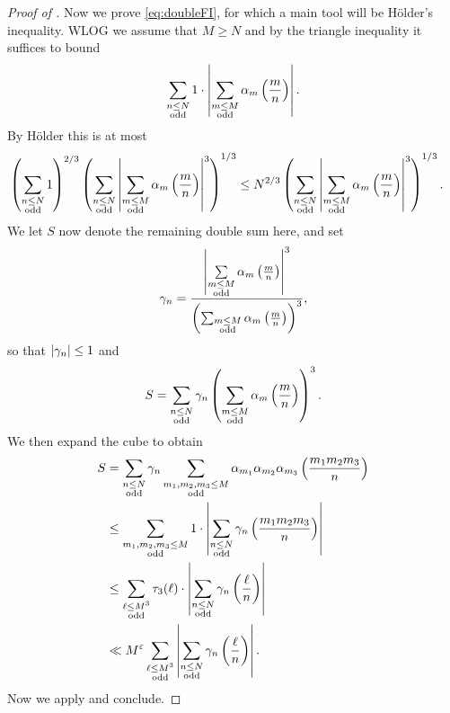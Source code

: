 \documentclass{lecturenotes}
\numberwithin{equation}{section}
\begin{document}
\begin{proof}[Proof of ]
    Now we prove \eqref{eq:doubleFI}, for which a main tool will be H\"older's inequality.  WLOG we assume that $M\geq N$ and by the triangle inequality it suffices to bound
    \[\sum_{\substack{n\leq N\\\textnormal{odd}}}1\cdot \left|{\sum_{\substack{m\leq M\\\textnormal{odd}}}\alpha_m\left(\frac{m}{n}\right)}\right|.\]
    By H\"older this is at most
    \begin{align*}
        \left({\sum_{\substack{n\leq N\\\textnormal{odd}}}1}\right)^{2/3}
        \left({\sum_{\substack{n\leq N\\\textnormal{odd}}}\left|{\sum_{\substack{m\leq M\\\textnormal{odd}}}\alpha_m\left(\frac{m}{n}\right)}\right|^3}\right)^{1/3}
        &\leq
        N^{2/3}\left({\sum_{\substack{n\leq N\\\textnormal{odd}}}\left|{\sum_{\substack{m\leq M\\\textnormal{odd}}}\alpha_m\left(\frac{m}{n}\right)}\right|^3}\right)^{1/3}.
    \end{align*}
    We let $S$ now denote the remaining double sum here, and set
    \[\gamma_n=\frac{\left|{\sum\limits_{\substack{m\leq M\\\textnormal{odd}}}\alpha_m\left(\frac{m}{n}\right)}\right|^3}{\left({\sum_{\substack{m\leq M\\\textnormal{odd}}}\alpha_m\left(\frac{m}{n}\right)}\right)^3},\]
    so that $\left|{\gamma_n}\right|\leq 1$ and 
    \[S=\sum_{\substack{n\leq N\\\textnormal{odd}}}\gamma_n\left({\sum_{\substack{m\leq M\\\textnormal{odd}}}\alpha_m\left(\frac{m}{n}\right)}\right)^3.\]
    We then expand the cube to obtain
    \begin{align*}
        S
        &=\sum_{\substack{n\leq N\\\textnormal{odd}}}\gamma_n
        \sum_{\substack{m_1,m_2,m_3\leq M\\\textnormal{odd}}}
        \alpha_{m_1}\alpha_{m_2}\alpha_{m_3}\left(\frac{m_1m_2m_3}{n}\right)
        \\&\leq 
        \sum_{\substack{m_1,m_2,m_3\leq M\\\textnormal{odd}}}1\cdot 
        \left|{\sum_{\substack{n\leq N\\\textnormal{odd}}}\gamma_n\left(\frac{m_1m_2m_3}{n}\right)}\right|
        \\&\leq 
        \sum_{\substack{\ell\leq M^3\\\textnormal{odd}}}\tau_3(\ell)\cdot 
        \left|{\sum_{\substack{n\leq N\\\textnormal{odd}}}\gamma_n\left(\frac{\ell}{n}\right)}\right|
        \\&\ll 
        M^{\varepsilon}
        \sum_{\substack{\ell\leq M^3\\\textnormal{odd}}} 
        \left|{\sum_{\substack{n\leq N\\\textnormal{odd}}}\gamma_n\left(\frac{\ell}{n}\right)}\right|.
    \end{align*}
    Now we apply  and conclude.
\end{proof}
\end{document}
